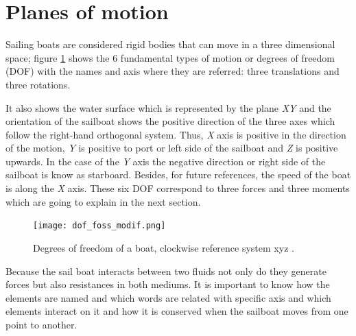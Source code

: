 \section{Planes of motion} \label{sec:planes_motio}
Sailing boats are considered rigid bodies that can move in a three dimensional space; figure \ref{DOF} shows the 6 fundamental types of motion or degrees of freedom (DOF)  with the names and axis where they are referred: three translations and three rotations. \par 
It also shows the water surface which is represented by the plane \textit{XY} and the orientation of the sailboat shows the positive direction of the three axes which follow the right-hand orthogonal system. Thus, \textit{X} axis is positive in the direction of the motion, \textit{Y} is positive to port or left side of the sailboat and \textit{Z} is positive upwards. In the case of the \textit{Y} axis the negative direction or right side of the sailboat is know as starboard.  Besides, for future references, the speed of the boat is along the \textit{X} axis. These six DOF correspond to three forces and three moments which are going to explain in the next section. \par 
\begin{figure} %
\centering
  \texttt{[image: dof\_foss\_modif.png]}
 \caption{Degrees of freedom of a boat, clockwise reference system xyz \cite{fossati2009aero}. }
\label{DOF}
\end{figure}


Because the sail boat interacts between two fluids not only do they generate forces but also resistances in both mediums. It is important to know how the elements are named and which words are related with specific axis and  %
which elements interact on it and how it is conserved when the sailboat moves from one point to another. \par 

